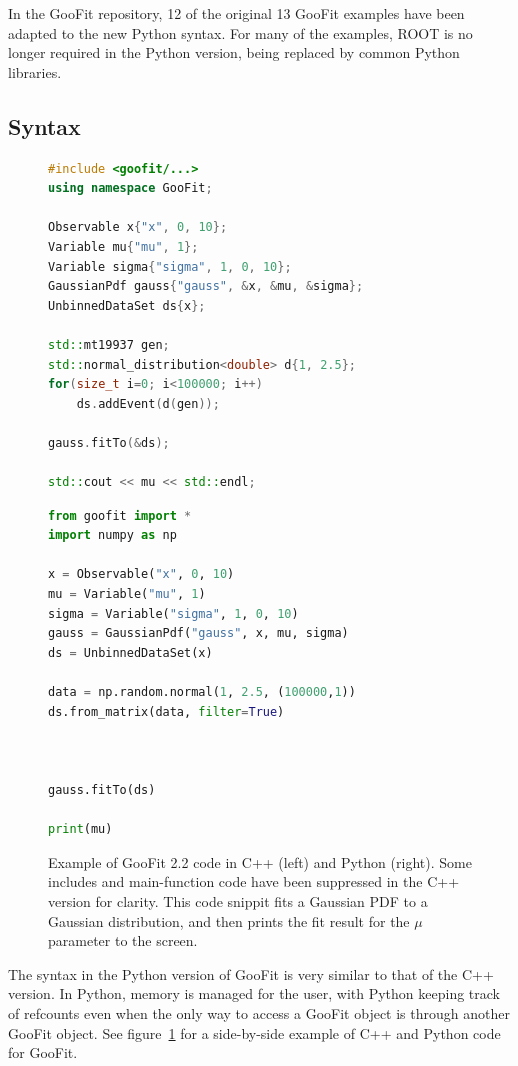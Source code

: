\documentclass{webofc}
\begin{document}
In the GooFit repository, 12 of the original 13 GooFit examples have been  adapted to the new Python syntax. For many of the examples, ROOT is no longer required in the Python version, being replaced by common Python libraries.

\subsection{Syntax}

\begin{figure}[h]
	    \begin{minipage}{.51\textwidth}
		\begin{lstlisting}[language=C++]
#include <goofit/...>
using namespace GooFit;

Observable x{"x", 0, 10};
Variable mu{"mu", 1};
Variable sigma{"sigma", 1, 0, 10};
GaussianPdf gauss{"gauss", &x, &mu, &sigma};
UnbinnedDataSet ds{x};

std::mt19937 gen;
std::normal_distribution<double> d{1, 2.5};
for(size_t i=0; i<100000; i++)
	ds.addEvent(d(gen));

gauss.fitTo(&ds);

std::cout << mu << std::endl;
		\end{lstlisting}
	    \end{minipage}%
	    \begin{minipage}{.49\textwidth}
		\begin{lstlisting}[language=Python] 
from goofit import *
import numpy as np

x = Observable("x", 0, 10)
mu = Variable("mu", 1)
sigma = Variable("sigma", 1, 0, 10)
gauss = GaussianPdf("gauss", x, mu, sigma)
ds = UnbinnedDataSet(x)

data = np.random.normal(1, 2.5, (100000,1))
ds.from_matrix(data, filter=True)



gauss.fitTo(ds)

print(mu)
		\end{lstlisting}
	    \end{minipage}
	\caption{Example of GooFit 2.2 code in C++ (left) and Python (right). Some includes and main-function code have been suppressed in the C++ version for clarity. This code snippit fits a Gaussian PDF to a Gaussian distribution, and then prints the fit result for the $\mu$ parameter to the screen.}
	\label{fig-code}
\end{figure}

The syntax in the Python version of GooFit is very similar to that of the C++ version. In Python, memory is managed for the user, with Python keeping track of refcounts even when the only way to access a GooFit object is through another GooFit object.  See figure~\ref{fig-code} for a side-by-side example of C++ and Python code for GooFit.
\end{document}
